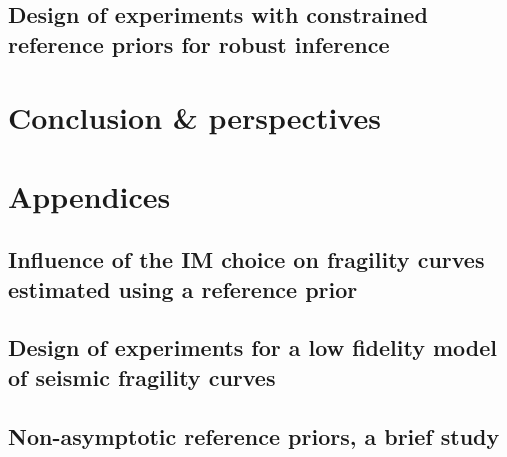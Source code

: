 \documentclass[a4paper]{book}
\begin{document}



\chapter{Design of experiments with constrained reference priors for robust inference%
}\label{chap:doe}






\part{Conclusion \& perspectives}\label{part:conclusion}





\appendix
\part*{Appendices}\label{part:appendix}


\chapter{Influence of the IM choice on fragility curves estimated using a reference prior}\label{app:chap:uncecomp}



\chapter{Design of experiments for a low fidelity model of seismic fragility curves}\label{app:chap:ESAIM}




\chapter{Non-asymptotic reference priors, a brief study}\label{app:chap:nonasympt}




\end{document}
